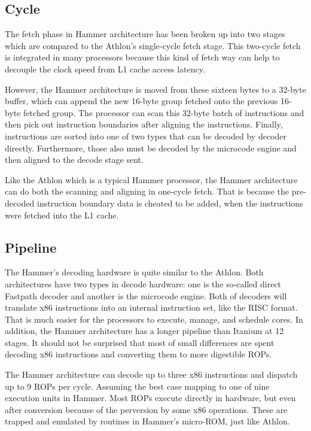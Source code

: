 \documentclass[letterpaper,10pt,compsoc,draftclsnofoot,onecolumn]{IEEEtran}
\begin{document}
\subsection{Cycle}
The fetch phase in Hammer architecture has been broken up into two stages which are compared to the Athlon's single-cycle fetch stage. This two-cycle fetch is integrated in many processors because this kind of fetch way can help to decouple the clock speed from L1 cache access latency.

However, the Hammer architecture is moved from these sixteen bytes to a 32-byte buffer, which can append the new 16-byte group fetched onto the previous 16-byte fetched group. The processor can scan this 32-byte batch of instructions and then pick out instruction boundaries after aligning the instructions\cite{inside_amd_64}. Finally, instructions are sorted into one of two types that can be decoded by decoder directly. Furthermore, those also must be decoded by the microcode engine and then aligned to the decode stage sent.

Like the Athlon which is a typical Hammer processor, the Hammer architecture can do both the scanning and aligning in one-cycle fetch. That is because the pre-decoded instruction boundary data is cheated to be added, when the instructions were fetched into the L1 cache\cite{pdf_amd_k8}.

\subsection{Pipeline}
The Hammer's decoding hardware is quite similar to the Athlon. Both architectures have two types in decode hardware: one is the so-called direct Fastpath decoder and another is the microcode engine. Both of decoders will translate x86 instructions into an internal instruction set, like the RISC format. That is much easier for the processors to execute, manage, and schedule cores. In addition, the Hammer architecture has a longer pipeline than Itanium at 12 stages\cite{pdf_amd_k8}. It should not be surprised that most of small differences are spent decoding x86 instructions and converting them to more digestible ROPs.

The Hammer architecture can decode up to three x86 instructions and dispatch up to 9 ROPs per cycle. Assuming the best case mapping to one of nine execution units in Hammer. Most ROPs execute directly in hardware, but even after conversion because of the perversion by some x86 operations. These are trapped and emulated by routines in Hammer's micro-ROM, just like Athlon.
\end{document}
